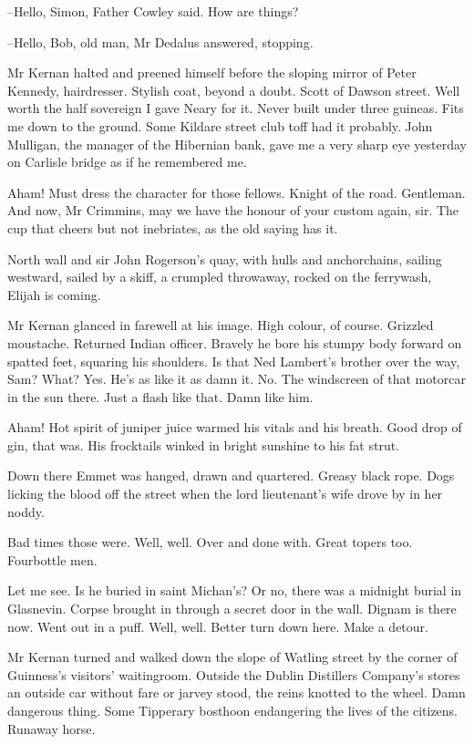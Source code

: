--Hello, Simon,
Father Cowley said.
How are things?

--Hello, Bob, old man,
Mr Dedalus answered,
stopping.

Mr Kernan halted and preened himself
before the sloping mirror of Peter
Kennedy, hairdresser.
Stylish coat, beyond a doubt.
Scott of Dawson
street.
Well worth the half sovereign I gave Neary for it.
Never built
under three guineas.
Fits me down to the ground.
Some Kildare street club
toff had it probably.
John Mulligan, the manager of the Hibernian bank,
gave me a very sharp eye yesterday
on Carlisle bridge as if he remembered
me.

Aham!
Must dress the character for those fellows.
Knight of the road.
Gentleman.
And now, Mr Crimmins,
may we have the honour of your custom again, sir.
The cup that cheers but not inebriates,
as the old saying has it.

North wall and sir John Rogerson's quay,
with hulls and anchorchains,
sailing westward,
sailed by a skiff,
a crumpled throwaway,
rocked on the
ferrywash,
Elijah is coming.

Mr Kernan glanced in farewell at his image.
High colour, of course.
Grizzled moustache.
Returned Indian officer.
Bravely he bore his stumpy body forward on spatted feet,
squaring his shoulders.
Is that Ned Lambert's brother over the way, Sam?
What?
Yes.
He's as like it as damn it.
No.
The windscreen of that motorcar in the sun there.
Just a flash like that.
Damn like him.%

Aham!
Hot spirit of juniper juice warmed his vitals and his breath.
Good
drop of gin, that was.
His frocktails winked in bright sunshine to his
fat strut.

Down there
Emmet was hanged, drawn and quartered.
Greasy black rope.
Dogs
licking the blood off the street
when the lord lieutenant's wife drove by
in her noddy.

Bad times those were.
Well, well.
Over and done with.
Great topers too.
Fourbottle men.

Let me see.
Is he buried in saint Michan's?
Or no, there was a midnight burial in Glasnevin.
Corpse brought in through a secret door in the wall.
Dignam is there now.
Went out in a puff.
Well, well.
Better turn down here.
Make a detour.

Mr Kernan turned and walked down the slope of Watling street
by the
corner of Guinness's visitors' waitingroom.
Outside the Dublin Distillers
Company's stores
an outside car without fare or jarvey stood,
the reins
knotted to the wheel.
Damn dangerous thing.
Some Tipperary bosthoon
endangering the lives of the citizens.
Runaway horse.

